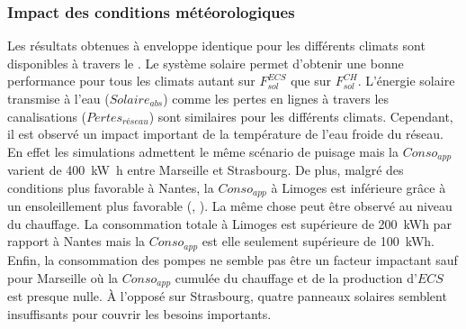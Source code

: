 \subsubsection{Impact des conditions météorologiques} %
\label{ssub:impact_des_conditions_meteorologiques}
Les résultats obtenues à enveloppe identique pour les différents climats sont disponibles
à travers le . Le système solaire permet d’obtenir une
bonne performance pour tous les climats autant sur $F_{sol}^{ECS}$ que sur $F_{sol}^{CH}$.
L’énergie solaire transmise à l’eau ($Solaire_{abs}$) comme les pertes en lignes à travers
les canalisations ($Pertes_{réseau}$) sont similaires pour les différents climats.
Cependant, il est observé un impact important de la température de l’eau froide du réseau.
En effet les simulations admettent le même scénario de puisage mais la $Conso_{app}$
varient de \SI{400}{\kilo\watt\hour} entre Marseille et Strasbourg. De plus, malgré des
conditions plus favorable à Nantes, la $Conso_{app}$ à Limoges est inférieure grâce à un
ensoleillement plus favorable (, ).
La même chose peut être observé au niveau du chauffage. La consommation totale à Limoges
est supérieure de \SI{200}{kWh} par rapport à Nantes mais la $Conso_{app}$ est elle
seulement supérieure de \SI{100}{kWh}. Enfin, la consommation des pompes ne semble pas
être un facteur impactant sauf pour Marseille où la $Conso_{app}$ cumulée du chauffage et
de la production d’$ECS$ est presque nulle. À l’opposé sur Strasbourg, quatre panneaux
solaires semblent insuffisants pour couvrir les besoins importants.

